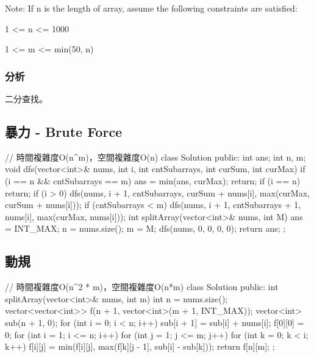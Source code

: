 Note:
If n is the length of array, assume the following constraints are satisfied:
\begindot
\item 1 <= n <= 1000
\item 1 <= m <= min(50, n)
\myenddot


\subsubsection{分析}
二分查找。

\subsection{暴力 - Brute Force}
\begin{Code}
// 時間複雜度O(n^m)，空間複雜度O(n)
class Solution {
public:
    int ans;
    int n, m;
    void dfs(vector<int>& nums, int i, int cntSubarrays, int curSum, int curMax) {
        if (i == n && cntSubarrays == m) {
            ans = min(ans, curMax);
            return;
        }
        if (i == n) {
            return;
        }
        if (i > 0) {
            dfs(nums, i + 1, cntSubarrays, curSum + nums[i], max(curMax, curSum + nums[i]));
        }
        if (cntSubarrays < m) {
            dfs(nums, i + 1, cntSubarrays + 1, nums[i], max(curMax, nums[i]));
        }
    }
    int splitArray(vector<int>& nums, int M) {
        ans = INT_MAX;
        n = nums.size();
        m = M;
        dfs(nums, 0, 0, 0, 0);
        return ans;
    }
};
\end{Code}


\subsection{動規}
\begin{Code}
// 時間複雜度O(n^2 * m)，空間複雜度O(n*m)
class Solution {
public:
    int splitArray(vector<int>& nums, int m) {
        int n = nums.size();
        vector<vector<int>> f(n + 1, vector<int>(m + 1, INT_MAX));
        vector<int> sub(n + 1, 0);
        for (int i = 0; i < n; i++) {
            sub[i + 1] = sub[i] + nums[i];
        }
        f[0][0] = 0;
        for (int i = 1; i <= n; i++) {
            for (int j = 1; j <= m; j++) {
                for (int k = 0; k < i; k++) {
                    f[i][j] = min(f[i][j], max(f[k][j - 1], sub[i] - sub[k]));
                }
            }
        }
        return f[n][m];
    }
};
\end{Code}

